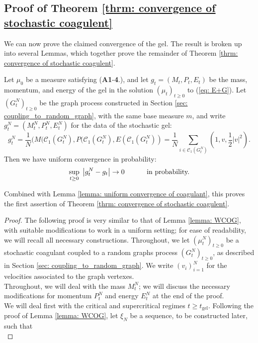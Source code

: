   \subsection{Proof of Theorem \ref{thrm: convergence of stochastic coagulent}}
   We can now prove the claimed convergence of the gel. The result is broken up into several Lemmas, which together prove the remainder of Theorem \ref{thrm: convergence of stochastic coagulent}.
  \begin{lemma}\label{lemma: COG} Let $\mu_0$ be a measure satisfying (\textbf{A1}-\textbf{4}.), and let $g_t=(M_t,P_t,E_t)$ be the mass, momentum, and energy of the gel in the solution $(\mu_t)_{t\ge 0}$ to (\ref{eq: E+G}). Let $(G^N_t)_{t\ge 0}$ be the graph process constructed in Section \ref{sec: coupling_to_random_graph}, with the same base measure $m$, and write $g^N_t=(M^N_t, P^N_t, E^N_t)$ for the data of the stochastic gel: \begin{equation} g^N_t=\frac{1}{N}(M(\mathcal{C}_1(G^N_t),P(\mathcal{C}_1(G^N_t),E(\mathcal{C}_1(G^N_t))=\frac{1}{N}\sum_{i \in \mathcal{C}_1(G^N_t)} \left(1,v,\frac{1}{2}|v|^2\right). \end{equation} Then we have uniform convergence in probability: \begin{equation} \sup_{t\ge 0}\hspace{0.1cm}\left|g^N_t-g_t\right|\rightarrow 0 \hspace{1cm}\text{ in probability.}\end{equation}  \end{lemma} Combined with Lemma \ref{lemma: uniform convergence of coagulant}, this proves the first assertion of Theorem \ref{thrm: convergence of stochastic coagulent}. \begin{proof} The following proof is very similar to that of Lemma \ref{lemma: WCOG}, with suitable modifications to work in a uniform setting; for ease of readability, we will recall all necessary constructions.   Throughout, we let $(\mu^N_t)_{t\geq 0}$ be a stochastic coagulant coupled to a random graphs process $(G^N_t)_{t\geq 0}$, as described in Section \ref{sec: coupling_to_random_graph}. We write $(v_i)_{i=1}^N$ for the velocities associated to the graph vertexes. \medskip \\ Throughout, we will deal with the mass $M^N_t$; we will discuss the necessary modifications for momentum $P^N_t$ and energy $E^N_t$ at the end of the proof. \medskip \\ We will deal first with the critical and supercritical regimes $t\ge t_\mathrm{gel}$. Following the proof of Lemma \ref{lemma: WCOG}, let $\xi_N$ be a sequence, to be constructed later, such that \begin{equation}\label{eq: choice of xiN}

\end{equation}
\end{proof}
